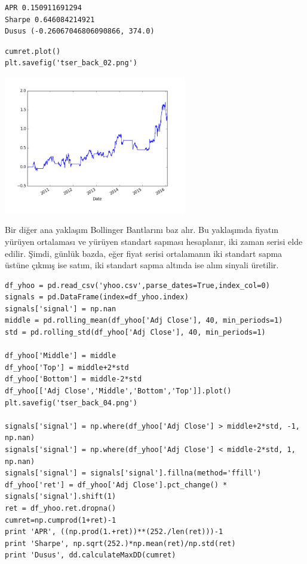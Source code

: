 \documentclass[12pt,fleqn]{article}\usepackage{../../common}
\begin{document}
\begin{verbatim}
APR 0.150911691294
Sharpe 0.646084214921
Dusus (-0.26067046806090866, 374.0)
\end{verbatim}

\begin{verbatim}
cumret.plot()
plt.savefig('tser_back_02.png')
\end{verbatim}

\includegraphics[height=6cm]{tser_back_02.png}

Bir diğer ana yaklaşım Bollinger Bantlarını baz alır. Bu yaklaşımda fiyatın
yürüyen ortalaması ve yürüyen standart sapması hesaplanır, iki zaman serisi elde
edilir. Şimdi, günlük bazda, eğer fiyat serisi ortalamanın iki standart sapma
üstüne çıkmış ise satım, iki standart sapma altında ise alım sinyali üretilir.

\begin{verbatim}
df_yhoo = pd.read_csv('yhoo.csv',parse_dates=True,index_col=0)
signals = pd.DataFrame(index=df_yhoo.index) 
signals['signal'] = np.nan
middle = pd.rolling_mean(df_yhoo['Adj Close'], 40, min_periods=1) 
std = pd.rolling_std(df_yhoo['Adj Close'], 40, min_periods=1)

df_yhoo['Middle'] = middle
df_yhoo['Top'] = middle+2*std
df_yhoo['Bottom'] = middle-2*std
df_yhoo[['Adj Close','Middle','Bottom','Top']].plot()
plt.savefig('tser_back_04.png')

signals['signal'] = np.where(df_yhoo['Adj Close'] > middle+2*std, -1, np.nan) 
signals['signal'] = np.where(df_yhoo['Adj Close'] < middle-2*std, 1, np.nan)
signals['signal'] = signals['signal'].fillna(method='ffill')
df_yhoo['ret'] = df_yhoo['Adj Close'].pct_change() * signals['signal'].shift(1)
ret = df_yhoo.ret.dropna()
cumret=np.cumprod(1+ret)-1
print 'APR', ((np.prod(1.+ret))**(252./len(ret)))-1
print 'Sharpe', np.sqrt(252.)*np.mean(ret)/np.std(ret)
print 'Dusus', dd.calculateMaxDD(cumret)
\end{verbatim}
\end{document}

